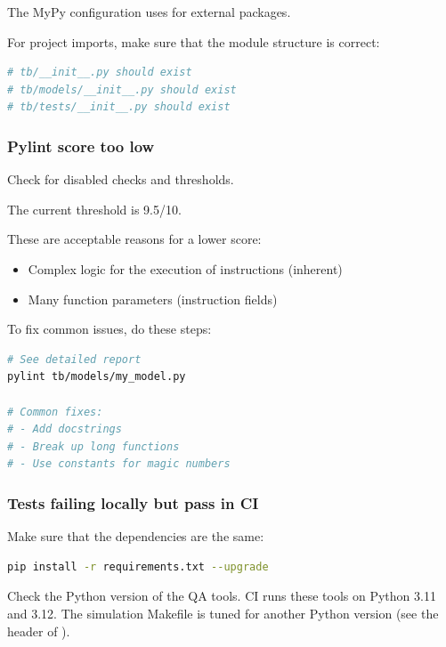 The MyPy configuration uses  for external packages.

For project imports, make sure that the module structure is correct:

\begin{lstlisting}[language=Python]
# tb/__init__.py should exist
# tb/models/__init__.py should exist
# tb/tests/__init__.py should exist
\end{lstlisting}

\subsubsection{Pylint score too low}\label{um:guide:local-qa:pylint-score-too-low}

Check  for disabled checks and thresholds.

The current threshold is 9.5/10.

These are acceptable reasons for a lower score:

\begin{itemize}
\tightlist
\item
  Complex logic for the execution of instructions (inherent)
\item
  Many function parameters (instruction fields)
\end{itemize}

To fix common issues, do these steps:

\begin{lstlisting}[language=bash]
# See detailed report
pylint tb/models/my_model.py

# Common fixes:
# - Add docstrings
# - Break up long functions
# - Use constants for magic numbers
\end{lstlisting}

\subsubsection{Tests failing locally but pass in CI}\label{um:guide:local-qa:tests-failing-locally-but-pass-in-ci}

Make sure that the dependencies are the same:

\begin{lstlisting}[language=bash]
pip install -r requirements.txt --upgrade
\end{lstlisting}

Check the Python version of the QA tools.
CI runs these tools on Python 3.11 and 3.12.
The simulation Makefile is tuned for another Python version (see the header of ).


